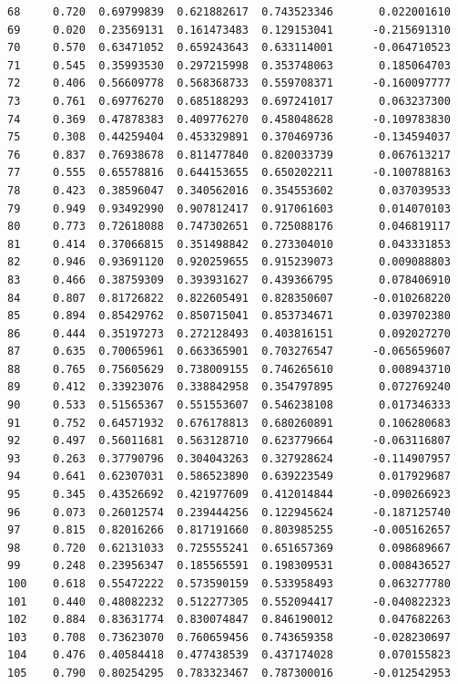 \documentclass[
  letterpaper,
  DIV=11,
  numbers=noendperiod]{scrartcl}
\begin{document}
\begin{verbatim}
68     0.720  0.69799839  0.621882617  0.743523346       0.022001610
69     0.020  0.23569131  0.161473483  0.129153041      -0.215691310
70     0.570  0.63471052  0.659243643  0.633114001      -0.064710523
71     0.545  0.35993530  0.297215998  0.353748063       0.185064703
72     0.406  0.56609778  0.568368733  0.559708371      -0.160097777
73     0.761  0.69776270  0.685188293  0.697241017       0.063237300
74     0.369  0.47878383  0.409776270  0.458048628      -0.109783830
75     0.308  0.44259404  0.453329891  0.370469736      -0.134594037
76     0.837  0.76938678  0.811477840  0.820033739       0.067613217
77     0.555  0.65578816  0.644153655  0.650202211      -0.100788163
78     0.423  0.38596047  0.340562016  0.354553602       0.037039533
79     0.949  0.93492990  0.907812417  0.917061603       0.014070103
80     0.773  0.72618088  0.747302651  0.725088176       0.046819117
81     0.414  0.37066815  0.351498842  0.273304010       0.043331853
82     0.946  0.93691120  0.920259655  0.915239073       0.009088803
83     0.466  0.38759309  0.393931627  0.439366795       0.078406910
84     0.807  0.81726822  0.822605491  0.828350607      -0.010268220
85     0.894  0.85429762  0.850715041  0.853734671       0.039702380
86     0.444  0.35197273  0.272128493  0.403816151       0.092027270
87     0.635  0.70065961  0.663365901  0.703276547      -0.065659607
88     0.765  0.75605629  0.738009155  0.746265610       0.008943710
89     0.412  0.33923076  0.338842958  0.354797895       0.072769240
90     0.533  0.51565367  0.551553607  0.546238108       0.017346333
91     0.752  0.64571932  0.676178813  0.680260891       0.106280683
92     0.497  0.56011681  0.563128710  0.623779664      -0.063116807
93     0.263  0.37790796  0.304043263  0.327928624      -0.114907957
94     0.641  0.62307031  0.586523890  0.639223549       0.017929687
95     0.345  0.43526692  0.421977609  0.412014844      -0.090266923
96     0.073  0.26012574  0.239444256  0.122945624      -0.187125740
97     0.815  0.82016266  0.817191660  0.803985255      -0.005162657
98     0.720  0.62131033  0.725555241  0.651657369       0.098689667
99     0.248  0.23956347  0.185565591  0.198309531       0.008436527
100    0.618  0.55472222  0.573590159  0.533958493       0.063277780
101    0.440  0.48082232  0.512277305  0.552094417      -0.040822323
102    0.884  0.83631774  0.830074847  0.846190012       0.047682263
103    0.708  0.73623070  0.760659456  0.743659358      -0.028230697
104    0.476  0.40584418  0.477438539  0.437174028       0.070155823
105    0.790  0.80254295  0.783323467  0.787300016      -0.012542953

\end{verbatim}
\end{document}
